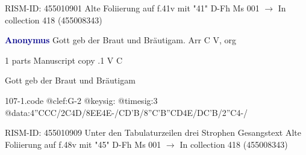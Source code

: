 \documentclass[twocolumn]{book}
\begin{document}
\newline RISM-ID: 455010901
\newline Alte Foliierung auf f.41v mit "41"
\newline D-Fh  Ms 001
\newline $\rightarrow$ In collection 418 (455008343)

\newline \par \vspace{7pt} \textcolor{darkblue}{\textbf{Anonymus  }}
\newline Gott geb der Braut und Bräutigam. Arr  C  
\newline V, org
\newline \begin{itshape}\end{itshape} 
\newline \textcolor{darkblue}{}  1 parts  
\newline Manuscript copy
.1  V  C
\newline \begin{footnotesize} Gott geb der Braut und Bräutigam \end{footnotesize}  
\begin{filecontents*}{107-1.code}
@clef:G-2
@keysig:
@timesig:3
@data:4''CCC/2C4D/{8EE}4E-/CD'B/{8''C'B''CD}4E/DC'B/2''C4-/
\end{filecontents*}
\newline
%

\newline RISM-ID: 455010909
\newline Unter den Tabulaturzeilen drei Strophen Gesangstext
\newline Alte Foliierung auf f.48v mit "45"
\newline D-Fh  Ms 001
\newline $\rightarrow$ In collection 418 (455008343)
\end{document}
